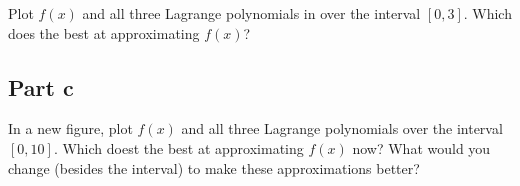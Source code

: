 \begin{question}
    Plot $f(x)$ and all three Lagrange polynomials in \MATLAB over the interval $[0,3]$. Which does the best at approximating $f(x)$?
\end{question}

\begin{answer}
    
\end{answer}

\subsection{Part c}

\begin{question}
    In a new figure, plot $f(x)$ and all three Lagrange polynomials over the interval $[0,10]$. Which doest the best at approximating $f(x)$ now? What would you change (besides the interval) to make these approximations better?
\end{question}

\begin{answer}
    
\end{answer}